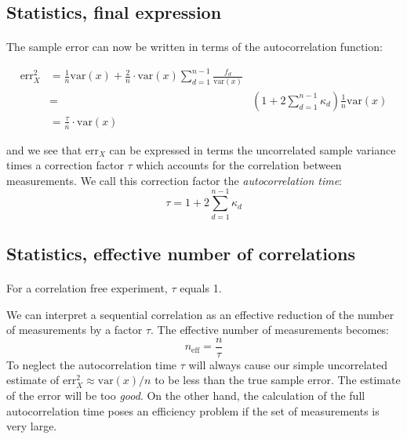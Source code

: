 \documentclass[%
oneside,                 %
final,                   %
10pt]{article}
\begin{document}
\subsection*{Statistics, final expression}

\paragraph{}
The sample error can now be
written in terms of the autocorrelation function:

\begin{align}
\mathrm{err}_X^2 &=
\frac{1}{n}\mathrm{var}(x)+\frac{2}{n}\cdot\mathrm{var}(x)\sum_{d=1}^{n-1}
\frac{f_d}{\mathrm{var}(x)}\nonumber\\ &=&
\left(1+2\sum_{d=1}^{n-1}\kappa_d\right)\frac{1}{n}\mathrm{var}(x)\nonumber\\
&=\frac{\tau}{n}\cdot\mathrm{var}(x)
\end{align}

and we see that $\mathrm{err}_X$ can be expressed in terms the
uncorrelated sample variance times a correction factor $\tau$ which
accounts for the correlation between measurements. We call this
correction factor the \emph{autocorrelation time}:
\begin{equation}
\tau = 1+2\sum_{d=1}^{n-1}\kappa_d
\label{eq:autocorrelation_time}
\end{equation}



\subsection*{Statistics, effective number of correlations}

\paragraph{}
For a correlation free experiment, $\tau$
equals 1.

We can interpret a sequential
correlation as an effective reduction of the number of measurements by
a factor $\tau$. The effective number of measurements becomes:
\[
n_\mathrm{eff} = \frac{n}{\tau}
\]
To neglect the autocorrelation time $\tau$ will always cause our
simple uncorrelated estimate of $\mathrm{err}_X^2\approx \mathrm{var}(x)/n$ to
be less than the true sample error. The estimate of the error will be
too \emph{good}. On the other hand, the calculation of the full
autocorrelation time poses an efficiency problem if the set of
measurements is very large.
\end{document}
